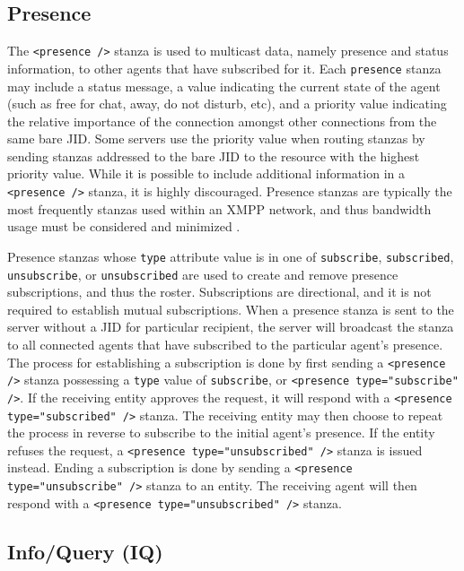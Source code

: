 \subsection{Presence}
\label{sec:Presence}

The \texttt{<presence />} stanza is used to multicast data, namely presence
and status information, to other agents that have subscribed for it. Each
\texttt{presence} stanza may include a status message, a value indicating the
current state of the agent (such as free for chat, away, do not disturb, etc),
and a priority value indicating the relative importance of the connection
amongst other connections from the same bare JID. Some servers use the priority
value when routing stanzas by sending stanzas addressed to the bare JID
to the resource with the highest priority value. While it is possible to
include additional information in a \texttt{<presence />} stanza, it is highly
discouraged. Presence stanzas are typically the most frequently stanzas used
within an XMPP network, and thus bandwidth usage must be considered and
minimized \cite{XMPP-Presence}.

Presence stanzas whose \texttt{type} attribute value is in one of
\texttt{subscribe}, \texttt{subscribed}, \texttt{unsubscribe}, or
\texttt{unsubscribed} are used to create and remove presence subscriptions,
and thus the roster. Subscriptions are directional, and it is not required
to establish mutual subscriptions. When a presence stanza is sent to the
server without a JID for particular recipient, the server will broadcast
the stanza to all connected agents that have subscribed to the particular
agent's presence. The process for establishing a subscription is done by
first sending a \texttt{<presence />} stanza possessing a \texttt{type} value
of \texttt{subscribe}, or \texttt{<presence type="subscribe" />}. If the
receiving entity approves the request, it will respond with a \texttt{<presence
type="subscribed" />} stanza. The receiving entity may then choose to repeat
the process in reverse to subscribe to the initial agent's presence. If the
entity refuses the request, a \texttt{<presence type="unsubscribed" />} stanza
is issued instead. Ending a subscription is done by sending a \texttt{<presence
type="unsubscribe" />} stanza to an entity. The receiving agent will then
respond with a \texttt{<presence type="unsubscribed" />} stanza.


\subsection{Info/Query (IQ)}
\label{sec:Iq}

